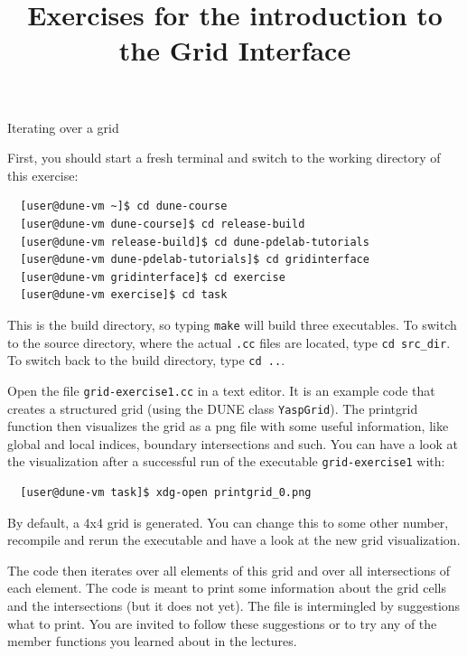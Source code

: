 \documentclass[12pt,a4paper]{article}
\title{\textbf{Exercises for the introduction to the Grid Interface}}
\begin{document}
\exerciseheader

\begin{Exercise}{Iterating over a grid}

First, you should start a fresh terminal and switch to the working directory of this exercise:
\begin{lstlisting}
  [user@dune-vm ~]$ cd dune-course
  [user@dune-vm dune-course]$ cd release-build
  [user@dune-vm release-build]$ cd dune-pdelab-tutorials
  [user@dune-vm dune-pdelab-tutorials]$ cd gridinterface
  [user@dune-vm gridinterface]$ cd exercise
  [user@dune-vm exercise]$ cd task
\end{lstlisting}

This is the build directory, so typing \lstinline!make! will build three executables.
To switch to the source directory, where the actual \lstinline!.cc! files are located, type \lstinline!cd src_dir!.
To switch back to the build directory, type \lstinline!cd ..!.

Open the file \texttt{grid-exercise1.cc} in a text editor.  It is an
example code that creates a structured grid (using the DUNE class
\texttt{YaspGrid}). The printgrid function then visualizes the grid
as a png file with some useful information, like global and local
indices, boundary intersections and such. You can have a look at the
visualization after a successful run of the executable \lstinline!grid-exercise1!
with:

\begin{lstlisting}
  [user@dune-vm task]$ xdg-open printgrid_0.png
\end{lstlisting}%

By default, a 4x4 grid is generated. You can change this to some
other number, recompile and rerun the executable and have a look at
the new grid visualization.

The code then iterates over all elements of this grid and
over all intersections of each element.  The code is meant to print
some information about the grid cells and the intersections (but it
does not yet).  The file is intermingled by suggestions what to print.
You are invited to follow these suggestions or to try any of the
member functions you learned about in the lectures.

\begin{center}
\end{center}
\end{Exercise}
\end{document}
